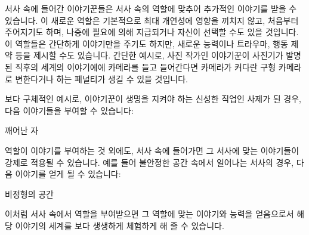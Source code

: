 \documentclass{report}
\begin{document}
	서사 속에 들어간 이야기꾼들은 서사 속의 역할에 맞추어 추가적인 이야기를 받을 수 있습니다. 이 새로운 역할은 기본적으로 최대 개연성에 영향을 끼치지 않고, 처음부터 주어지기도 하며, 나중에 필요에 의해 지급되거나 자신이 선택할 수도 있을 것입니다. 이 역할들은 간단하게 이야기만을 주기도 하지만, 새로운 능력이나 트라우마, 행동 제약 등을 제시할 수도 있습니다. 간단한 예시로, 사진 작가인 이야기꾼이 사진기가 발명된 직후의 세계의 이야기에에 카메라를 들고 들어간다면 카메라가 커다란 구형 카메라로 변한다거나 하는 페널티가 생길 수 있을 것입니다.
	
	\bigskip
	
	보다 구체적인 예시로, 이야기꾼이 생명을 지켜야 하는 신성한 직업인 사제가 된 경우, 다음 이야기들을 부여할 수 있습니다:
	
	\begin{lite}{깨어난 자}
		
	\end{lite}
	
	역할이 이야기를 부여하는 것 외에도, 서사 속에 들어가면 그 서사에 맞는 이야기들이 강제로 적용될 수 있습니다. 예를 들어 불안정한 공간 속에서 일어나는 서사의 경우, 다음 이야기를 얻게 될 수 있습니다:
	\begin{lite}{비정형의 공간}
	\end{lite}
	
	이처럼 서사 속에서 역할을 부여받으면 그 역할에 맞는 이야기와 능력을 얻음으로서 해당 이야기의 세계를 보다 생생하게 체험하게 해 줄 수 있습니다.
\end{document}
